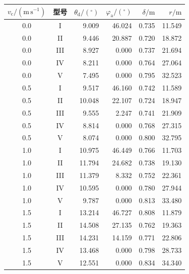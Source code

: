 \begin{tabular}{ccrrrr}
\toprule
$v_{\mathrm c}/(\mathrm{m\,s^{-1}})$ & 型号 & $\theta_{\mathrm d}/(^\circ)$ & $\varphi_{\mathrm a}/(^\circ)$ & $\delta/\mathrm m$ & $r/\mathrm m$ \\
\midrule
0.0 & I & 9.009 & 46.024 & 0.735 & 11.549 \\
0.0 & II & 9.446 & 20.887 & 0.720 & 18.872 \\
0.0 & III & 8.927 & 0.000 & 0.737 & 21.694 \\
0.0 & IV & 8.211 & 0.000 & 0.764 & 27.064 \\
0.0 & V & 7.495 & 0.000 & 0.795 & 32.523 \\
0.5 & I & 9.517 & 46.160 & 0.742 & 11.589 \\
0.5 & II & 10.048 & 22.107 & 0.724 & 18.947 \\
0.5 & III & 9.555 & 2.247 & 0.741 & 21.909 \\
0.5 & IV & 8.814 & 0.000 & 0.768 & 27.315 \\
0.5 & V & 8.074 & 0.000 & 0.800 & 32.795 \\
1.0 & I & 10.975 & 46.449 & 0.766 & 11.703 \\
1.0 & II & 11.794 & 24.682 & 0.738 & 19.130 \\
1.0 & III & 11.379 & 8.332 & 0.752 & 22.361 \\
1.0 & IV & 10.595 & 0.000 & 0.780 & 27.944 \\
1.0 & V & 9.787 & 0.000 & 0.813 & 33.480 \\
1.5 & I & 13.214 & 46.727 & 0.808 & 11.879 \\
1.5 & II & 14.508 & 27.135 & 0.762 & 19.363 \\
1.5 & III & 14.231 & 14.159 & 0.771 & 22.806 \\
1.5 & IV & 13.468 & 0.000 & 0.798 & 28.733 \\
1.5 & V & 12.551 & 0.000 & 0.834 & 34.340 \\
\bottomrule
\end{tabular}
